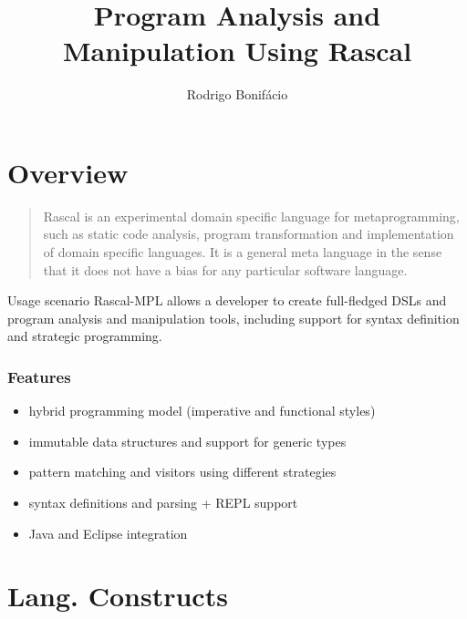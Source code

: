 \documentclass{beamer}
\title{Program Analysis and Manipulation Using Rascal}
\author{Rodrigo Bonif\'{a}cio}
\begin{document}
\begin{frame}
\titlepage
\end{frame}

\section{Overview}

\begin{frame}
  \begin{quote}
Rascal is an experimental domain specific language for metaprogramming, such as static code analysis, program transformation and implementation of domain specific languages. It is a general meta language in the sense that it does not have a bias for any particular software language.
  \end{quote}
\end{frame}

\begin{frame}
  \begin{block}{Usage scenario}
    Rascal-MPL allows a developer
    to create full-fledged DSLs and program
    analysis and manipulation tools,
    including support for syntax
    definition and strategic programming. 
  \end{block}
\end{frame}

\begin{frame}
  \frametitle{Features}

  \begin{itemize}
    \item hybrid programming model (imperative and functional styles)
    \item immutable data structures and support for generic types
    \item pattern matching and visitors using different strategies
    \item syntax definitions and parsing + REPL support  
    \item Java and Eclipse integration  
  \end{itemize}  
\end{frame}

\section{Lang. Constructs}

\end{document}

